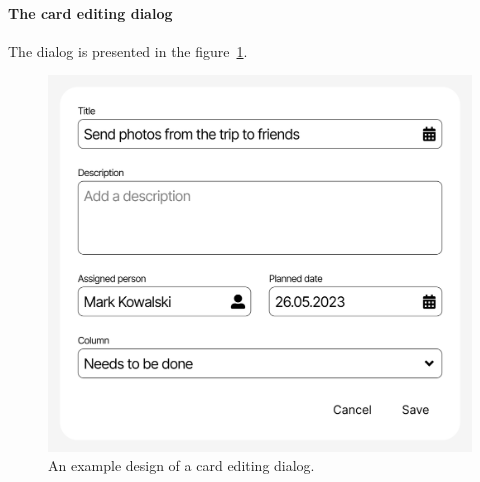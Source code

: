\paragraph{The card editing dialog}
The dialog is presented in the figure~\ref{fig:3-4-card-editing-dialog}.

\begin{figure}
    \centering
    \includegraphics[height=0.4\textheight]{./3-research-methodology/card-editing-dialog}
    \caption{An example design of a card editing dialog.}
    \label{fig:3-4-card-editing-dialog}
\end{figure}
